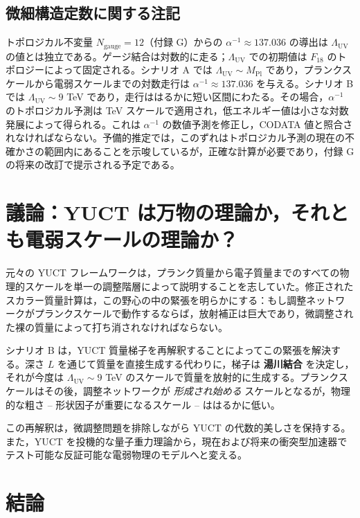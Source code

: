 \documentclass[11pt,a4paper]{article}
\newcommand{\Mpl}{M_{\mathrm{Pl}}}
\newcommand{\LUV}{\Lambda_{\mathrm{UV}}}
\theoremstyle{remark}
\begin{document}
	\subsection{微細構造定数に関する注記}
	
	トポロジカル不変量 \(N_{\mathrm{gauge}} = 12\)（付録 G）からの \(\alpha^{-1} \approx 137.036\) の導出は \(\LUV\) の値とは独立である。ゲージ結合は対数的に走る；\(\LUV\) での初期値は \(F_{18}\) のトポロジーによって固定される。シナリオ A では \(\LUV \sim \Mpl\) であり，プランクスケールから電弱スケールまでの対数走行は \(\alpha^{-1} \approx 137.036\) を与える。シナリオ B では \(\LUV \sim 9\) TeV であり，走行ははるかに短い区間にわたる。その場合，\(\alpha^{-1}\) のトポロジカル予測は TeV スケールで適用され，低エネルギー値は小さな対数発展によって得られる。これは \(\alpha^{-1}\) の数値予測を修正し，CODATA 値と照合されなければならない。予備的推定では，このずれはトポロジカル予測の現在の不確かさの範囲内にあることを示唆しているが，正確な計算が必要であり，付録 G の将来の改訂で提示される予定である。
	
	\section{議論：YUCT は万物の理論か，それとも電弱スケールの理論か？}
	\label{sec:discussion}
	
	元々の YUCT フレームワークは，プランク質量から電子質量までのすべての物理的スケールを単一の調整階層によって説明することを志していた。修正されたスカラー質量計算は，この野心の中の緊張を明らかにする：もし調整ネットワークがプランクスケールで動作するならば，放射補正は巨大であり，微調整された裸の質量によって打ち消されなければならない。
	
	シナリオ B は，YUCT 質量梯子を再解釈することによってこの緊張を解決する。深さ \(L\) を通じて質量を直接生成する代わりに，梯子は \textbf{湯川結合} を決定し，それが今度は \(\LUV \sim 9\) TeV のスケールで質量を放射的に生成する。プランクスケールはその後，調整ネットワークが \textit{形成され始める} スケールとなるが，物理的な粗さ – 形状因子が重要になるスケール – ははるかに低い。
	
	この再解釈は，微調整問題を排除しながら YUCT の代数的美しさを保持する。また，YUCT を投機的な量子重力理論から，現在および将来の衝突型加速器でテスト可能な反証可能な電弱物理のモデルへと変える。
	
	\section{結論}
	\label{sec:conclusion}
	
\end{document}
